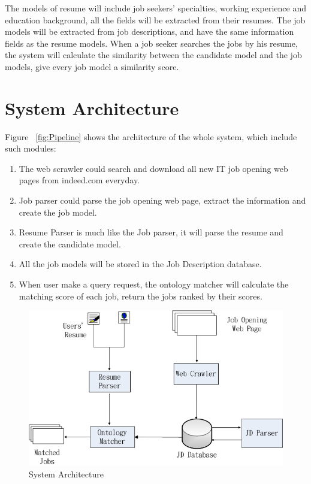 The models of resume will include job seekers' specialties, working experience and education background, all the fields will be extracted from their resumes. The job models will be extracted from job descriptions, and have the same information fields as the resume models.  When a job seeker searches the jobs by his resume, the system will calculate the similarity between the candidate model and the job models, give every job model a similarity score.

\section{System Architecture}

Figure ~\ref{fig:Pipeline} shows the architecture of the whole system, which include such modules:

\begin{enumerate}
    \item The web scrawler could search and download all new IT job opening web pages  from indeed.com everyday.
    \item Job parser could parse the job opening web page, extract the information and create the job model.
    \item Resume Parser is much like the Job parser, it will parse the resume and create the candidate model.
    \item All the job models will be stored in the Job Description database.
    \item When user make a query request, the ontology matcher will calculate the matching score of each job, return the jobs ranked by their scores.
\end{enumerate}

\begin{figure}[htbp]
  \centering
  \includegraphics[scale=0.5]{images/arch.png}
  \caption{System Architecture}
  \label{fig:arch}
\end{figure}

